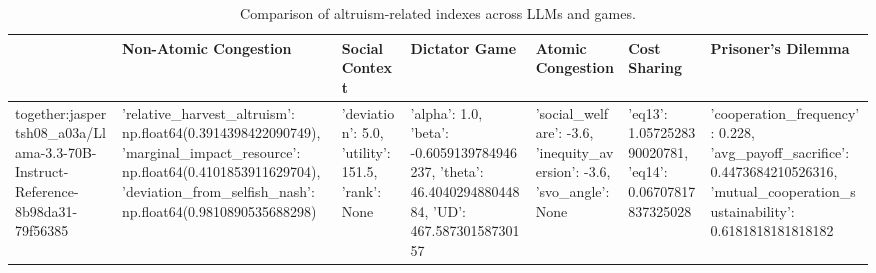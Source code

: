 \begin{table}
\caption{Comparison of altruism-related indexes across LLMs and games.}
\label{tab:altruism_indexes}
\begin{tabular}{lllllll}
\toprule
 & Non-Atomic Congestion & Social Context & Dictator Game & Atomic Congestion & Cost Sharing & Prisoner's Dilemma \\
\midrule
together:jaspertsh08_a03a/Llama-3.3-70B-Instruct-Reference-8b98da31-79f56385 & {'relative_harvest_altruism': np.float64(0.3914398422090749), 'marginal_impact_resource': np.float64(0.4101853911629704), 'deviation_from_selfish_nash': np.float64(0.9810890535688298)} & {'deviation': 5.0, 'utility': 151.5, 'rank': None} & {'alpha': 1.0, 'beta': -0.6059139784946237, 'theta': 46.404029488044884, 'UD': 467.58730158730157} & {'social_welfare': -3.6, 'inequity_aversion': -3.6, 'svo_angle': None} & {'eq13': 1.0572528390020781, 'eq14': 0.06707817837325028} & {'cooperation_frequency': 0.228, 'avg_payoff_sacrifice': 0.4473684210526316, 'mutual_cooperation_sustainability': 0.6181818181818182} \\
\bottomrule
\end{tabular}
\end{table}
